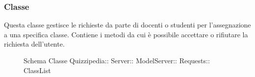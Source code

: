\subsubsection{Classe }
Questa classe gestisce le richieste da parte di docenti o studenti per l'assegnazione a una specifica classe. Contiene i metodi da cui è possibile accettare o rifiutare la richiesta dell'utente.
\begin{figure}[H]
\centering
\noindent{}
\caption[Schema Classe ClassList]{Schema Classe Quizzipedia:: Server:: ModelServer:: Requests:: ClassList}
\end{figure}
